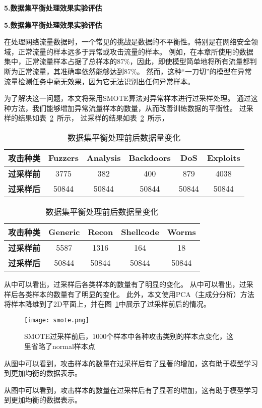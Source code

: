 \textbf{5.数据集平衡处理效果实验评估}\par
\textbf{5.数据集平衡处理效果实验评估}\par
在处理网络流量数据时，一个常见的挑战是数据的不平衡性。特别是在网络安全领域，正常流量的样本远多于异常或攻击流量的样本。
例如，在本章所使用的数据集中，正常流量样本占据了总样本的87\%，因此，即使模型简单地将所有流量都判断为正常流量，其准确率依然能够达到87\%。
然而，这种“一刀切”的模型在异常流量检测任务中毫无效果，因为它无法识别出任何异常样本。\par

为了解决这一问题，本文将采用SMOTE算法对异常样本进行过采样处理。
通过这种方法，我们能够增加异常流量样本的数量，从而改善训练数据的平衡性。
过采样的结果如表~\ref{tab:attack_num_transposed_part1}~所示，
过采样的结果如表~\ref{tab:attack_num_transposed_part1}~所示，
\begin{table}[h]
	\centering
	\caption{数据集平衡处理前后数据量变化}
	\label{tab:attack_num_transposed_part1}
	\begin{tabular}{cccccc}
		\toprule
		攻击种类          & \textbf{Fuzzers} & \textbf{Analysis} & \textbf{Backdoors} & \textbf{DoS} & \textbf{Exploits} \\
		\midrule
		\textbf{过采样前} & 3775             & 382               & 400                & 879          & 4038              \\
		\textbf{过采样后} & 50844            & 50844             & 50844              & 50844        & 50844             \\
		\bottomrule
	\end{tabular}
	\begin{tabular}{ccccc}
		\toprule
		攻击种类          & \textbf{Generic} & \textbf{Recon} & \textbf{Shellcode} & \textbf{Worms} \\
		\midrule
		\textbf{过采样前} & 5587             & 1316           & 164                & 18             \\
		\textbf{过采样后} & 50844            & 50844          & 50844              & 50844          \\
		\bottomrule
	\end{tabular}
\end{table}
从中可以看出，过采样后各类样本的数量有了明显的变化。
从中可以看出，过采样后各类样本的数量有了明显的变化。
此外，本文使用PCA（主成分分析）方法将样本降维到了2D平面上，并在图~\ref{fig:prepostsmote}中展示了过采样前后的情况。
\begin{figure}[htbp]
	\centering
	\texttt{[image: smote.png]}
	\caption{SMOTE过采样前后，1000个样本中各种攻击类别的样本点变化，这里省略了normal样本点}
	\label{fig:prepostsmote}
\end{figure}
从图中可以看到，攻击样本的数量在过采样后有了显著的增加，这有助于模型学习到更加均衡的数据表示。\par
从图中可以看到，攻击样本的数量在过采样后有了显著的增加，这有助于模型学习到更加均衡的数据表示。\par

